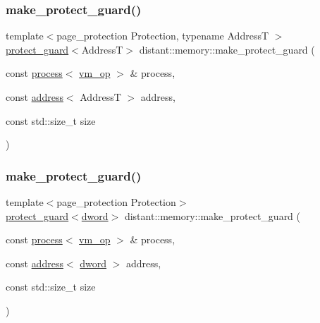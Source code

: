\subsubsection{\texorpdfstring{make\+\_\+protect\+\_\+guard()}{make\_protect\_guard()}\hspace{0.1cm}{\footnotesize\ttfamily [1/2]}}
{\footnotesize\ttfamily template$<$page\+\_\+protection Protection, typename AddressT $>$ \\
\mbox{\hyperlink{classdistant_1_1memory_1_1protect__guard}{protect\+\_\+guard}}$<$AddressT$>$ distant\+::memory\+::make\+\_\+protect\+\_\+guard (\begin{DoxyParamCaption}\item[{const \mbox{\hyperlink{classdistant_1_1kernel__objects_1_1process}{process}}$<$ \mbox{\hyperlink{namespacedistant_af02d4223cd2f509cc373ac9d83655f19}{vm\+\_\+op}} $>$ \&}]{process,  }\item[{const \mbox{\hyperlink{classdistant_1_1memory_1_1address}{address}}$<$ AddressT $>$}]{address,  }\item[{const std\+::size\+\_\+t}]{size }\end{DoxyParamCaption})}

\mbox{\label{namespacedistant_1_1memory_a157d87a06b5c0fc6efaf536407c37a31}} 
\subsubsection{\texorpdfstring{make\+\_\+protect\+\_\+guard()}{make\_protect\_guard()}\hspace{0.1cm}{\footnotesize\ttfamily [2/2]}}
{\footnotesize\ttfamily template$<$page\+\_\+protection Protection$>$ \\
\mbox{\hyperlink{classdistant_1_1memory_1_1protect__guard}{protect\+\_\+guard}}$<$\mbox{\hyperlink{namespacedistant_a9fa41a5a1a17dcbd24da1c1855c92489}{dword}}$>$ distant\+::memory\+::make\+\_\+protect\+\_\+guard (\begin{DoxyParamCaption}\item[{const \mbox{\hyperlink{classdistant_1_1kernel__objects_1_1process}{process}}$<$ \mbox{\hyperlink{namespacedistant_af02d4223cd2f509cc373ac9d83655f19}{vm\+\_\+op}} $>$ \&}]{process,  }\item[{const \mbox{\hyperlink{classdistant_1_1memory_1_1address}{address}}$<$ \mbox{\hyperlink{namespacedistant_a9fa41a5a1a17dcbd24da1c1855c92489}{dword}} $>$}]{address,  }\item[{const std\+::size\+\_\+t}]{size }\end{DoxyParamCaption})}

